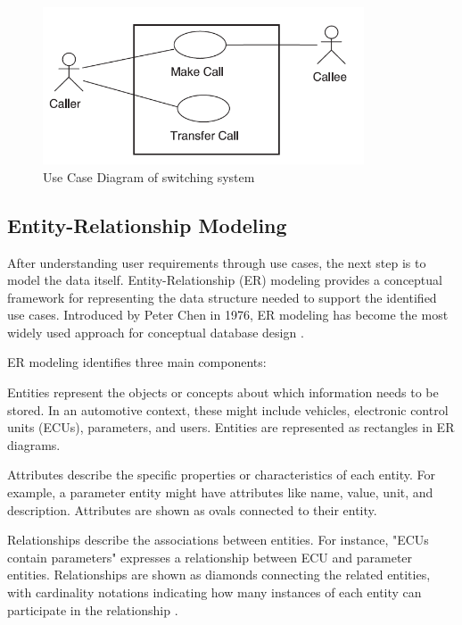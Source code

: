 \begin{figure}[ht]
    \centering
    \includegraphics[width=0.85\textwidth]{figures/use_case_diagram.png}
    \caption{Use Case Diagram of switching system \cite{jacobson2004use}}
    \label{fig:use-case-diagram}
\end{figure}

\subsection{Entity-Relationship Modeling}
\label{subsec:entity-relationship-modeling}

After understanding user requirements through use cases, the next step is to model the data itself. Entity-Relationship (ER) modeling provides a conceptual framework for representing the data structure needed to support the identified use cases. Introduced by Peter Chen in 1976, ER modeling has become the most widely used approach for conceptual database design \cite{chen1976entity}.

ER modeling identifies three main components:

Entities represent the objects or concepts about which information needs to be stored. In an automotive context, these might include vehicles, electronic control units (ECUs), parameters, and users. Entities are represented as rectangles in ER diagrams.

Attributes describe the specific properties or characteristics of each entity. For example, a parameter entity might have attributes like name, value, unit, and description. Attributes are shown as ovals connected to their entity.

Relationships describe the associations between entities. For instance, "ECUs contain parameters" expresses a relationship between \ac{ECU} and parameter entities. Relationships are shown as diamonds connecting the related entities, with cardinality notations indicating how many instances of each entity can participate in the relationship \cite{elmasri2015fundamentals}.

